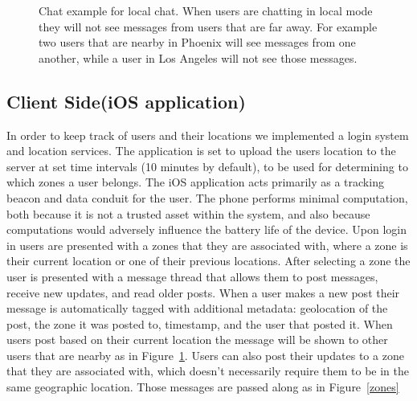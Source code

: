 \begin{figure}
\caption{Chat example for local chat.  When users are chatting in local mode they will not see messages from users that are far away.  For example two users that are nearby in Phoenix will see messages from one another, while a user in Los Angeles will not see those messages.}
\label{chatExample}
\end{figure}

\subsection{Client Side(iOS application)}
In order to keep track of users and their locations we implemented a login system and location services.  The application is set to upload the users location to the server at set time intervals (10 minutes by default), to be used for determining to which zones a user belongs.  The iOS application acts primarily as a tracking beacon and data conduit for the user.  The phone performs minimal computation, both because it is not a trusted asset within the system, and also because computations would adversely influence the battery life of the device.  Upon login in users are presented with a zones that they are associated with, where a zone is their current location or one of their previous locations.  After selecting a zone the user is presented with a message thread that allows them to post messages, receive new updates, and read older posts. When a user makes a new post their message is automatically tagged with additional metadata: geolocation of the post, the zone it was posted to, timestamp, and the user that posted it. When users post based on their current location the message will be shown to other users that are nearby as in Figure~\ref{chatExample}.  Users can also post their updates to a zone that they are associated with, which doesn't necessarily require them to be in the same geographic location.  Those messages are passed along as in Figure~\ref{zones}

